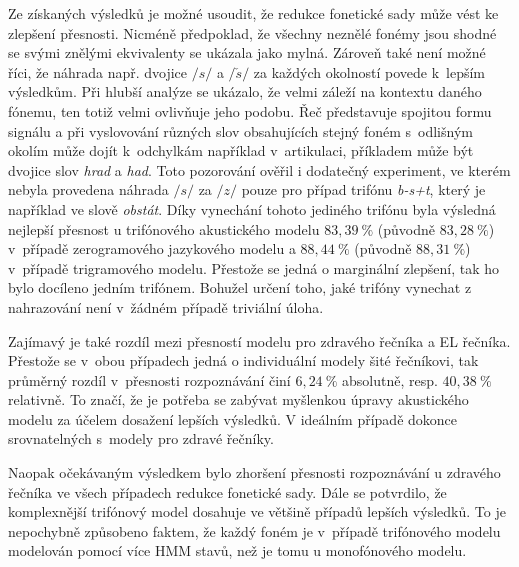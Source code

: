 Ze získaných výsledků je možné usoudit, že redukce fonetické sady může vést ke zlepšení přesnosti.
Nicméně předpoklad, že všechny neznělé fonémy jsou shodné se svými znělými ekvivalenty se ukázala jako mylná.
Zároveň také není možné říci, že náhrada např. dvojice $/s/$ a $/\check{s}/$  za každých okolností povede  k~lepším výsledkům.
Při hlubší analýze se ukázalo, že velmi záleží na kontextu daného fónemu, ten totiž velmi ovlivňuje jeho podobu.
Řeč představuje spojitou formu signálu a při vyslovování různých slov obsahujících stejný foném s~odlišným okolím  může dojít  k~odchylkám například v~artikulaci, příkladem může být dvojice slov \textit{hrad} a \textit{had}.
Toto pozorování ověřil i dodatečný experiment, ve kterém nebyla provedena náhrada $/s/$ za $/z/$ pouze pro případ trifónu \textit{b-s+t}, který je například ve slově \textit{obstát}.
Díky vynechání tohoto jediného trifónu byla výsledná nejlepší přesnost u trifónového akustického modelu $83,39~\%$ (původně $83,28~\%$) v~případě zerogramového jazykového modelu a $88,44~\%$ (původně $88,31~\%$) v~případě trigramového modelu.
Přestože se jedná o marginální zlepšení, tak ho bylo docíleno jedním trifónem.
Bohužel určení toho, jaké trifóny vynechat z nahrazování není v~žádném případě triviální úloha.

Zajímavý je také rozdíl mezi přesností modelu pro zdravého řečníka a EL řečníka.
Přestože se v~obou případech jedná o individuální modely šité  řečníkovi, tak průměrný rozdíl v~přesnosti rozpoznávání činí $6,24~\%$ absolutně, resp. $40,38~\%$ relativně.
To značí, že je potřeba se zabývat myšlenkou úpravy akustického modelu za účelem dosažení lepších výsledků.
V ideálním případě dokonce srovnatelných s~modely pro zdravé řečníky.

Naopak očekávaným výsledkem bylo zhoršení přesnosti rozpoznávání u zdravého řečníka ve všech případech redukce fonetické sady.
Dále se potvrdilo, že komplexnější trifónový model dosahuje ve většině případů lepších výsledků.
To je nepochybně způsobeno faktem, že každý foném je v~případě trifónového modelu modelován pomocí více HMM stavů, než je tomu u monofónového modelu.
